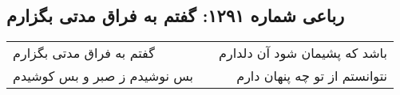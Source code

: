 \begin{center}
\section*{رباعی شماره ۱۲۹۱: گفتم به فراق مدتی بگزارم}
\label{sec:1291}
\begin{longtable}{l p{0.5cm} r}
گفتم به فراق مدتی بگزارم
&&
باشد که پشیمان شود آن دلدارم
\\
بس نوشیدم ز صبر و بس کوشیدم
&&
نتوانستم از تو چه پنهان دارم
\\
\end{longtable}
\end{center}
